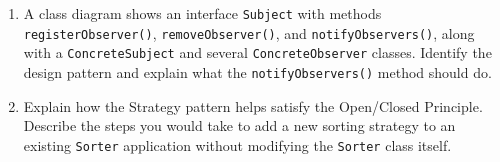 \documentclass[twoside=false,DIV=14]{scrartcl}
\begin{document}
\begin{enumerate}
\item A class diagram shows an interface \texttt{Subject} with methods \texttt{registerObserver()}, \texttt{removeObserver()}, and \texttt{notifyObservers()}, along with a \texttt{ConcreteSubject} and several \texttt{ConcreteObserver} classes.  Identify the design pattern and explain what the \texttt{notifyObservers()} method should do.

\item Explain how the Strategy pattern helps satisfy the Open/Closed Principle.  Describe the steps you would take to add a new sorting strategy to an existing \texttt{Sorter} application without modifying the \texttt{Sorter} class itself.
\end{enumerate}
\end{document}
